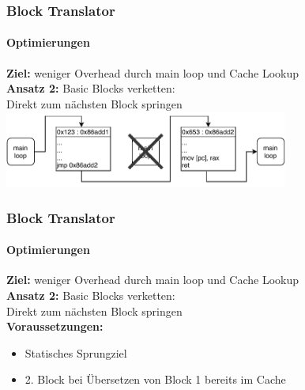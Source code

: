 \documentclass[german]{tum-presentation}
\begin{document}
\begin{frame}[fragile]
\begin{columns}
\begin{column}{0.5\textwidth}
		\end{column}
	\end{columns}
\end{frame}

\begin{frame}[fragile]
	\frametitle{Block Translator}
	\framesubtitle{Optimierungen}
	\textbf{Ziel:} weniger Overhead durch main loop und Cache Lookup \\
	\vspace{0.5cm}
	\textbf{Ansatz 2:} Basic Blocks verketten: \\ Direkt zum nächsten Block springen \\
	\onslide<2>
	\vspace{0.5cm}
	\includegraphics[width=0.7\textwidth]{diagrams/chained}
\end{frame}

\begin{frame}[fragile]
	\frametitle{Block Translator}
	\framesubtitle{Optimierungen}
	\textbf{Ziel:} weniger Overhead durch main loop und Cache Lookup \\
	\vspace{0.5cm}
	\textbf{Ansatz 2:} Basic Blocks verketten: \\ Direkt zum nächsten Block springen \\
	\vspace{0.5cm}
	\textbf{Voraussetzungen:}\\
	\begin{itemize}
		\item Statisches Sprungziel
		\item 2. Block bei Übersetzen von Block 1 bereits im Cache
	\end{itemize}
\end{frame}
\end{document}
